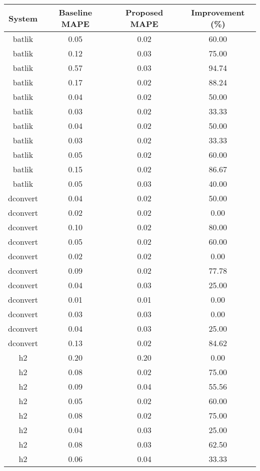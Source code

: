\begin{table}[h]
    \centering
    \begin{tabular}{|c|c|c|c|}
        \hline
        System & Baseline MAPE & Proposed MAPE & Improvement (\%) \\
        \hline
        batlik & 0.05 & 0.02 & 60.00 \\
        batlik & 0.12 & 0.03 & 75.00 \\
        batlik & 0.57 & 0.03 & 94.74 \\
        batlik & 0.17 & 0.02 & 88.24 \\
        batlik & 0.04 & 0.02 & 50.00 \\
        batlik & 0.03 & 0.02 & 33.33 \\
        batlik & 0.04 & 0.02 & 50.00 \\
        batlik & 0.03 & 0.02 & 33.33 \\
        batlik & 0.05 & 0.02 & 60.00 \\
        batlik & 0.15 & 0.02 & 86.67 \\
        batlik & 0.05 & 0.03 & 40.00 \\
        dconvert & 0.04 & 0.02 & 50.00 \\
        dconvert & 0.02 & 0.02 & 0.00 \\
        dconvert & 0.10 & 0.02 & 80.00 \\
        dconvert & 0.05 & 0.02 & 60.00 \\
        dconvert & 0.02 & 0.02 & 0.00 \\
        dconvert & 0.09 & 0.02 & 77.78 \\
        dconvert & 0.04 & 0.03 & 25.00 \\
        dconvert & 0.01 & 0.01 & 0.00 \\
        dconvert & 0.03 & 0.03 & 0.00 \\
        dconvert & 0.04 & 0.03 & 25.00 \\
        dconvert & 0.13 & 0.02 & 84.62 \\
        h2 & 0.20 & 0.20 & 0.00 \\
        h2 & 0.08 & 0.02 & 75.00 \\
        h2 & 0.09 & 0.04 & 55.56 \\
        h2 & 0.05 & 0.02 & 60.00 \\
        h2 & 0.08 & 0.02 & 75.00 \\
        h2 & 0.04 & 0.03 & 25.00 \\
        h2 & 0.08 & 0.03 & 62.50 \\
        h2 & 0.06 & 0.04 & 33.33 \\

\end{tabular}
\end{table}
